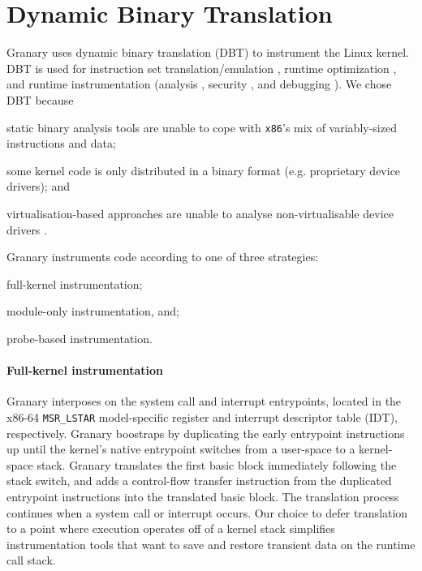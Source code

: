 \documentclass[preprint]{sigplanconf}
\begin{document}
\section{Dynamic Binary Translation}\label{sec:dbt}

Granary uses dynamic binary translation (DBT) to instrument the Linux kernel. DBT is used for instruction set translation/emulation \cite{QEMU}, runtime optimization \cite{DynamoRIOOptimisation}, and runtime instrumentation (analysis \cite{DynamoRIO}, security \cite{Vx32,NaCl}, and debugging \cite{Valgrind}). We chose DBT because \begin{inparaenum}[i)]
	\item static binary analysis tools are unable to cope with \texttt{x86}'s mix of variably-sized instructions and data; 
	\item some kernel code is only distributed in a binary format (e.g. proprietary device drivers); and
	\item virtualisation-based approaches are unable to analyse non-virtualisable device drivers \cite{DRK}.
\end{inparaenum}

Granary instruments code according to one of three strategies: \begin{inparaenum}[i)]
	\item full-kernel instrumentation;
	\item module-only instrumentation, and;
	\item probe-based instrumentation.
\end{inparaenum}

\paragraph{Full-kernel instrumentation}
Granary interposes on the system call and interrupt entrypoints, located in the x86-64 \texttt{MSR\_LSTAR} model-specific register and interrupt descriptor table (IDT), respectively. Granary boostraps by duplicating the early entrypoint instructions up until the kernel's native entrypoint switches from a user-space to a kernel-space stack. Granary translates the first basic block immediately following the stack switch, and adds a control-flow transfer instruction from the duplicated entrypoint instructions into the translated basic block. The translation process continues when a system call or interrupt occurs. Our choice to defer translation to a point where execution operates off of a kernel stack simplifies instrumentation tools that want to save and restore transient data on the runtime call stack.
\end{document}
